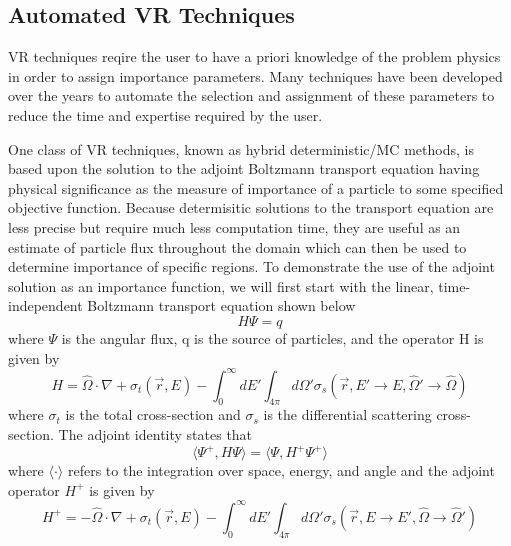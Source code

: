 \subsection{Automated VR Techniques}

VR techniques reqire the user to have a priori knowledge of the problem physics
in order to assign importance parameters.
Many techniques have been developed over the years to automate the selection and
assignment of these parameters to reduce the time and expertise required by
the user.

One class of VR techniques, known as hybrid deterministic/MC methods,
is based upon
the solution to the adjoint Boltzmann transport equation having physical
significance as the measure of importance of a particle to some specified
objective function.  
Because determisitic solutions to the transport equation are less precise but
require much less computation time, they are useful as an estimate of
particle flux throughout the domain which can then be used to determine
importance of specific regions.
To demonstrate the use of the adjoint solution as an importance function,
we will first start with the linear, time-independent Boltzmann transport
equation shown below
\begin{equation} \label{eq:1a}
  H\Psi = q
\end{equation}
where $\Psi$ is the angular flux, q is the source of particles, and the operator H
is given by
\begin{equation} \label{eq:1b}
		H = \widehat{\Omega} \cdot \nabla +
		    \sigma_{t}(\overrightarrow{r},E) - 
			\int_{0}^{\infty} dE'
			\int_{4\pi} d\Omega'
			\sigma_{s}( \overrightarrow{r}, E' 
			\rightarrow E, \widehat{\Omega}' 
			\rightarrow \widehat{\Omega} )
\end{equation}
where $\sigma_{t}$ is the total cross-section and $\sigma_{s}$ is the
differential scattering cross-section.
The adjoint identity states that
\begin{equation} \label{eq:2}
		\langle \Psi^{+} , H\Psi \rangle =
		\langle \Psi, H^{+}\Psi^{+} \rangle
\end{equation}
where $ \langle \cdot \rangle$ refers to the integration over space,
energy, and angle and the adjoint operator $H^{+}$ is given by
\begin{equation} \label{eq:2b}
		H^{+} = -\widehat{\Omega} \cdot \nabla +
		    \sigma_{t}(\overrightarrow{r},E) - 
			\int_{0}^{\infty} dE'
			\int_{4\pi} d\Omega'
			\sigma_{s}( \overrightarrow{r}, E 
			\rightarrow E', \widehat{\Omega} 
			\rightarrow \widehat{\Omega}' )
\end{equation}
